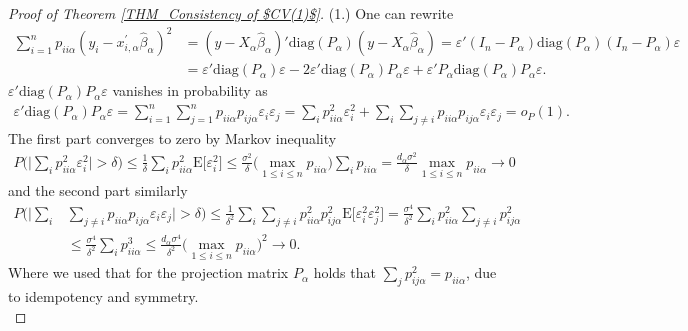 \documentclass[Research_Module_ES.tex]{subfiles}
\begin{document}
\begin{proof}[Proof of Theorem \ref{THM_Consistency of $CV(1)$}]
	(1.) One can rewrite 
	\begin{align}
	\sum_{i=1}^n p_{ii\alpha}(y_i-x_{i,\alpha}^\prime\hat{\beta}_\alpha)^2 &= (y-X_\alpha\hat{\beta}_\alpha)'\mathrm{diag}(P_\alpha)(y-X_\alpha\hat{\beta}_\alpha) 
	= \varepsilon'(I_n-P_\alpha)\mathrm{diag}(P_\alpha)(I_n-P_\alpha)\varepsilon\nonumber\\
	&= \varepsilon'\mathrm{diag}(P_\alpha)\varepsilon-2\varepsilon'\mathrm{diag}(P_\alpha)P_\alpha\varepsilon+\varepsilon'P_\alpha\mathrm{diag}(P_\alpha)P_\alpha \varepsilon. \label{schawarma_king}
	\end{align}
	$\varepsilon'\mathrm{diag}(P_\alpha)P_\alpha\varepsilon$ vanishes in probability as
	\begin{align*}
	\varepsilon'\mathrm{diag}(P_\alpha)P_\alpha\varepsilon= \sum_{i=1}^n\sum_{j=1}^np_{ii\alpha}p_{ij\alpha}\varepsilon_i\varepsilon_j
	=\sum_{i}p_{ii\alpha}^2\varepsilon_i^2 + \sum_{i}\sum_{j\neq i}p_{ii\alpha}p_{ij\alpha}\varepsilon_i\varepsilon_j=o_P(1).
	\end{align*}
	The first part converges to zero by Markov inequality 
	\begin{align*}
	P\biggl(\biggl|\sum_{i}p_{ii\alpha}^2\varepsilon_i^2\biggr|>\delta\biggr)
	\le \frac{1}{\delta}\sum_{i}p_{ii\alpha}^2\mathrm{E}\bigl[\varepsilon_i^2\bigr]
	\le \frac{\sigma^2}{\delta}\biggl(\max_{1\le i\le n}p_{ii\alpha}\biggr) \sum_{i}p_{ii\alpha} 
	= \frac{d_\alpha\sigma^2}{\delta}\max_{1\le i\le n}p_{ii\alpha} \to 0 
	\end{align*}
	and the second part similarly 
	\begin{align*}
	P\biggl(\biggl|\sum_{i}&\sum_{j\neq i}p_{ii\alpha}p_{ij\alpha}\varepsilon_i\varepsilon_j\biggr|>\delta\biggr)\le\frac{1}{\delta^2}\sum_{i}\sum_{j\neq i}p_{ii\alpha}^2p_{ij\alpha}^2\mathrm{E}\bigl[\varepsilon_i^2\varepsilon_j^2\bigr]
	= \frac{\sigma^4}{\delta^2}\sum_{i}p_{ii\alpha}^2\sum_{j\neq i}p_{ij\alpha}^2\\
	&\le \frac{\sigma^4}{\delta^2}\sum_{i}p_{ii\alpha}^3 \le \frac{d_\alpha\sigma^4}{\delta^2}\biggl(\max_{1\le i\le n}p_{ii\alpha}\biggr)^2 \to 0.
	\end{align*}
	Where we used that for the projection matrix $P_\alpha$ holds that
	$\sum_{j}p_{ij\alpha}^2=p_{ii\alpha}$, due to idempotency and symmetry.\\
	

\end{proof}
\end{document}
